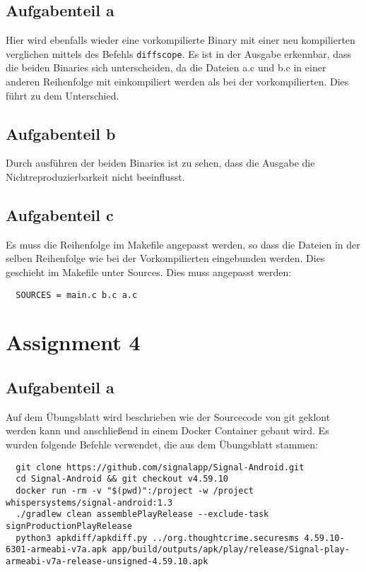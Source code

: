 \documentclass[a4paper,12pt,
headsepline,           %
oneside,               %
pointlessnumbers,      %
bibtotoc,              %
BCOR15mm               %
]{scrbook}
\begin{document}
\subsection*{Aufgabenteil a}
Hier wird ebenfalls wieder eine vorkompilierte Binary mit einer neu kompilierten verglichen mittels des Befehls \texttt{diffscope}.
Es ist in der Ausgabe erkennbar, dass die beiden Binaries sich unterscheiden, da die Dateien a.c und b.c in einer anderen Reihenfolge mit einkompiliert werden als bei der vorkompilierten. Dies führt zu dem Unterschied.

\subsection*{Aufgabenteil b}
Durch ausführen der beiden Binaries ist zu sehen, dass die Ausgabe die Nichtreproduzierbarkeit nicht beeinflusst.

\subsection*{Aufgabenteil c}
Es muss die Reihenfolge im Makefile angepasst werden, so dass die Dateien in der selben Reihenfolge wie bei der Vorkompilierten eingebunden werden. Dies geschieht im Makefile unter Sources. Dies muss angepasst werden:
\begin{lstlisting}
  SOURCES = main.c b.c a.c
\end{lstlisting}

\section*{Assignment 4}
\subsection*{Aufgabenteil a}
Auf dem Übungsblatt wird beschrieben wie der Sourcecode von git geklont werden kann und anschließend in einem Docker Container gebaut wird. Es wurden folgende Befehle verwendet, die aus dem Übungsblatt stammen:
\begin{lstlisting}
  git clone https://github.com/signalapp/Signal-Android.git
  cd Signal-Android && git checkout v4.59.10
  docker run -rm -v "$(pwd)":/project -w /project whispersystems/signal-android:1.3
  ./gradlew clean assemblePlayRelease --exclude-task signProductionPlayRelease
  python3 apkdiff/apkdiff.py ../org.thoughtcrime.securesms 4.59.10-6301-armeabi-v7a.apk app/build/outputs/apk/play/release/Signal-play-armeabi-v7a-release-unsigned-4.59.10.apk
\end{lstlisting}
\end{document}

